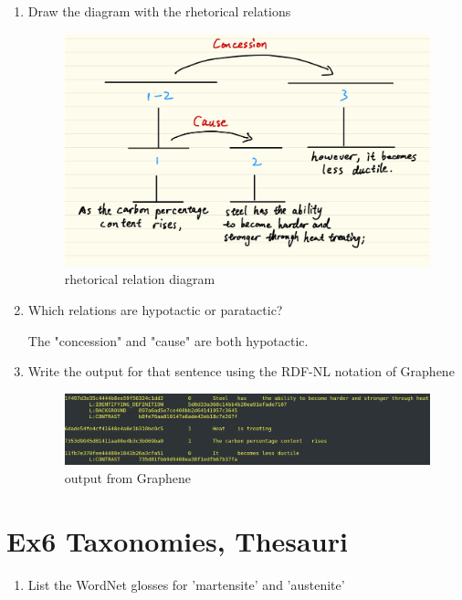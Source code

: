 \documentclass[12pt]{article}
\begin{document}
{\begin{enumerate}[1.]
	satellites: "As the carbon percentage content rises, steel has the ability to become harder 
	and stronger through heat treating;"
	\item Draw the diagram with the rhetorical relations
	\begin{figure}[ht]
		\centering
		\includegraphics[scale=0.15]{figs/rhetorical_structure.jpg}
		\caption{rhetorical relation diagram}
		\label{fig:label6}
	\end{figure}
	\item Which relations are hypotactic or paratactic?
	
	The "concession" and "cause" are both hypotactic.
	\item Write the output for that sentence using the RDF-NL notation of Graphene
	\begin{figure}[ht]
		\centering
		\includegraphics[scale=0.3]{figs/Graphene_output.png}
		\caption{output from Graphene}
		\label{fig:label6}
	\end{figure}
	
\end{enumerate}

\newpage
\section{Ex6 Taxonomies, Thesauri}
\label{sec: ex6}
\begin{enumerate}[1.]
	\item List the WordNet glosses for 'martensite' and 'austenite'
	

\end{enumerate}}
\end{document}
